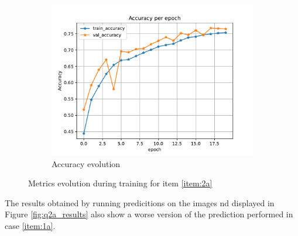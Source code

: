 \documentclass[10pt, a4paper]{article}
\begin{document}
\begin{figure}[htpb]
\begin{subfigure}[b]{0.32\textwidth}
      \centering
      \includegraphics[width=\textwidth]{images/Patch32_scratch_acc.pdf}
      \caption{Accuracy evolution}
      \label{fig:q2a_acc}
  \end{subfigure}
  \caption{Metrics evolution during training for item \ref{item:2a}}
  \label{fig:q2a_metrics}
\end{figure}

The results obtained by running predicitions on the images nd displayed in Figure \ref{fig:q2a_results} also show a worse version of the prediction performed in
case \ref{item:1a}.
\end{document}
